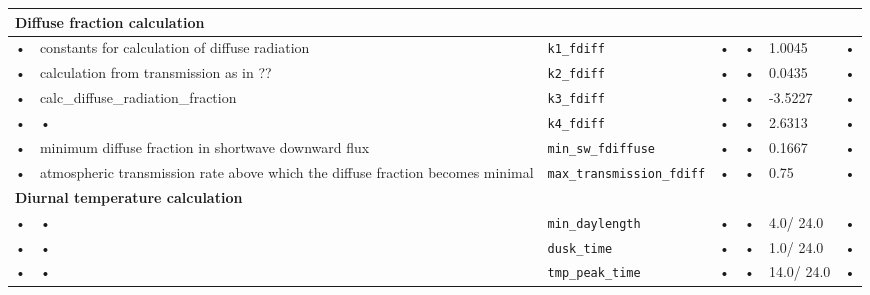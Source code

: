 \begin{table}
\begin{tabularx}{\linewidth}{|c|X|l|l|c|l|c|}
\multicolumn{6}{l}{\bf Diffuse fraction calculation}\\
\hline
• & constants for calculation of diffuse radiation & \texttt{k1\_fdiff} & • & • & 1.0045 & • \\
• & calculation from transmission as in  ?? & \texttt{k2\_fdiff} & • & • & 0.0435 & • \\
• & calc\_diffuse\_radiation\_fraction & \texttt{k3\_fdiff} & • & • & -3.5227 & • \\
• & • & \texttt{k4\_fdiff} & • & • & 2.6313 & • \\
• & minimum diffuse fraction in shortwave downward flux & \texttt{min\_sw\_fdiffuse} & • & • & 0.1667 & • \\
• & atmospheric transmission rate above which the diffuse fraction becomes minimal & \texttt{max\_transmission\_fdiff} & • & • & 0.75 & • \\
\hline 

\multicolumn{6}{l}{\bf Diurnal temperature calculation}\\
\hline
• & • & \texttt{min\_daylength} & • & • & 4.0/ 24.0 & • \\
• & • & \texttt{dusk\_time} & • & • & 1.0/ 24.0 & • \\
• & • & \texttt{tmp\_peak\_time} & • & • & 14.0/ 24.0 & • \\
\hline
\end{tabularx}
\end{table}


